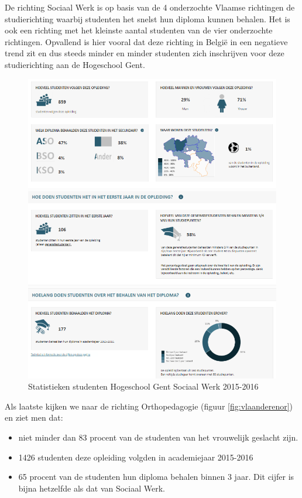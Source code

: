 De richting Sociaal Werk is op basis van de 4 onderzochte Vlaamse richtingen de studierichting waarbij studenten het snelst hun diploma kunnen behalen. Het is ook een richting met het kleinste aantal studenten van de vier onderzochte richtingen. Opvallend is hier vooral dat deze richting in België in een negatieve trend zit en dus steeds minder en minder studenten zich inschrijven voor deze studierichting aan de Hogeschool Gent.

\begin{figure}
	\includegraphics[width=\textwidth]
	{img/vlaanderen_sw.png}
	\caption{Statistieken studenten Hogeschool Gent Sociaal Werk 2015-2016
		\autocite{Onderwijs.vlaanderen.be2017}}
	\label{fig:vlaanderensw}
\end{figure}

Als laatste kijken we naar de richting Orthopedagogie (figuur \ref{fig:vlaanderenor}) en ziet men dat:
\begin{itemize}
	\item niet minder dan 83 procent van de studenten van het vrouwelijk geslacht zijn.
	\item 1426 studenten deze opleiding volgden in academiejaar 2015-2016
	\item 65 procent van de studenten hun diploma behalen binnen 3 jaar. Dit cijfer is bijna hetzelfde als dat van Sociaal Werk.
\end{itemize}


